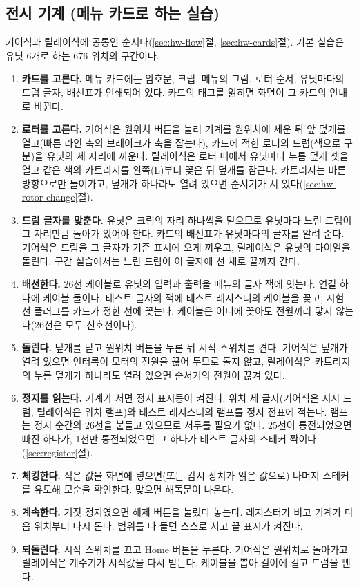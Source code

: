 \subsection{전시 기계 (메뉴 카드로 하는 실습)}

기어식과 릴레이식에 공통인 순서다(\ref{sec:hw-flow}절, \ref{sec:hw-cards}절). 기본 실습은 유닛 6개로 하는 676
위치의 구간이다.

\begin{enumerate}
\item \textbf{카드를 고른다.} 메뉴 카드에는 암호문, 크립, 메뉴의 그림, 로터 순서, 유닛마다의 드럼 글자, 배선표가
인쇄되어 있다. 카드의 태그를 읽히면 화면이 그 카드의 안내로 바뀐다.
\item \textbf{로터를 고른다.} 기어식은 원위치 버튼을 눌러 기계를 원위치에 세운 뒤 앞 덮개를 열고(빠른 라인 축의
브레이크가 축을 잡는다), 카드에 적힌 로터의 드럼(색으로 구분)을 유닛의 세 자리에 끼운다. 릴레이식은 로터 띠에서
유닛마다 누름 덮개 셋을 열고 같은 색의 카트리지를 왼쪽(L)부터 꽂은 뒤 덮개를 잠근다. 카트리지는 바른 방향으로만
들어가고, 덮개가 하나라도 열려 있으면 순서기가 서 있다(\ref{sec:hw-rotor-change}절).
\item \textbf{드럼 글자를 맞춘다.} 유닛은 크립의 자리 하나씩을 맡으므로 유닛마다 느린 드럼이 그 자리만큼 돌아가
있어야 한다. 카드의 배선표가 유닛마다의 글자를 알려 준다. 기어식은 드럼을 그 글자가 기준 표시에 오게 끼우고,
릴레이식은 유닛의 다이얼을 돌린다. 구간 실습에서는 느린 드럼이 이 글자에 선 채로 끝까지 간다.
\item \textbf{배선한다.} 26선 케이블로 유닛의 입력과 출력을 메뉴의 글자 잭에 잇는다. 연결 하나에 케이블 둘이다.
테스트 글자의 잭에 테스트 레지스터의 케이블을 꽂고, 시험 선 플러그를 카드가 정한 선에 꽂는다. 케이블은 어디에
꽂아도 전원끼리 닿지 않는다(26선은 모두 신호선이다).
\item \textbf{돌린다.} 덮개를 닫고 원위치 버튼을 누른 뒤 시작 스위치를 켠다. 기어식은 덮개가 열려 있으면 인터록이
모터의 전원을 끊어 두므로 돌지 않고, 릴레이식은 카트리지의 누름 덮개가 하나라도 열려 있으면 순서기의 전원이 끊겨 있다.
\item \textbf{정지를 읽는다.} 기계가 서면 정지 표시등이 켜진다. 위치 세 글자(기어식은 지시 드럼, 릴레이식은 위치
램프)와 테스트 레지스터의 램프를 정지 전표에 적는다. 램프는 정지 순간의 26선을 붙들고 있으므로 서두를 필요가
없다. 25선이 통전되었으면 빠진 하나가, 1선만 통전되었으면 그 하나가 테스트 글자의 스테커 짝이다
(\ref{sec:register}절).
\item \textbf{체킹한다.} 적은 값을 화면에 넣으면(또는 감시 장치가 읽은 값으로) 나머지 스테커를 유도해 모순을
확인한다. 맞으면 해독문이 나온다.
\item \textbf{계속한다.} 거짓 정지였으면 해제 버튼을 눌렀다 놓는다. 레지스터가 비고 기계가 다음 위치부터 다시
돈다. 범위를 다 돌면 스스로 서고 끝 표시가 켜진다.
\item \textbf{되돌린다.} 시작 스위치를 끄고 Home 버튼을 누른다. 기어식은 원위치로 돌아가고 릴레이식은 계수기가
시작값을 다시 받는다. 케이블을 뽑아 걸이에 걸고 드럼을 뺀다.
\end{enumerate}

